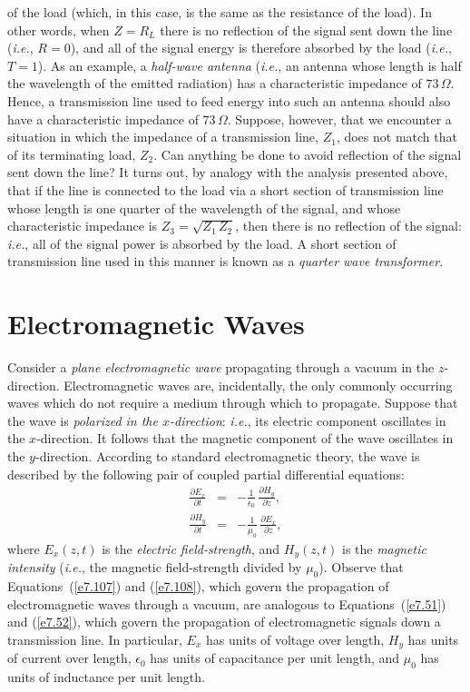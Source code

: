 of the load (which, in this case, is the same as the resistance of the load). In other words,
when $Z=R_L$ there is no reflection of the signal sent down the line ({\em i.e.}, $R=0$),
and all of the signal energy is therefore absorbed by the load ({\em i.e.}, $T=1$). As an example, a
{\em half-wave antenna}\/ ({\em i.e.}, an antenna whose length is half the wavelength
of the emitted radiation) has a characteristic impedance of $73\,\Omega$. Hence, a
transmission line used to feed energy into such an antenna should also have
a characteristic impedance of $73\,\Omega$. Suppose, however, that we encounter a situation in which the
impedance of a transmission line, $Z_1$, does not match that of its
terminating load, $Z_2$. Can anything be done to avoid  reflection of the signal sent down the line? It turns out,
by analogy with the analysis presented above, that if the line is connected
to the load via a short section of transmission line whose length is one quarter
of the wavelength of the signal, and whose characteristic impedance is
$Z_3=\sqrt{Z_1\,Z_2}$, then there is no reflection of the signal: {\em i.e.}, all of the signal power is absorbed by the
load. A short section of transmission line used in this manner is known as a
{\em quarter wave transformer}. 

\section{Electromagnetic Waves}\label{s7.7}
Consider a {\em plane electromagnetic wave}\/ propagating through a vacuum in the $z$-direction. Electromagnetic waves are, incidentally, the only
commonly occurring waves which do not require a medium through which to
propagate. 
Suppose that the wave is {\em polarized in the $x$-direction}: {\em i.e.}, its electric
component  oscillates in the $x$-direction. It follows that the magnetic
component of the wave oscillates in the $y$-direction. According to standard electromagnetic theory, the wave is
described by the following pair of coupled partial differential equations:
\begin{eqnarray}\label{e7.107}
\frac{\partial E_x}{\partial t} &=& - \frac{1}{\epsilon_0}\,\frac{\partial H_y}{\partial z},\label{e7.101}\\[0.5ex]
\frac{\partial H_y}{\partial t} &=& -\frac{1}{\mu_0}\,\frac{\partial E_x}{\partial z},\label{e7.108}
\end{eqnarray}
where $E_x(z,t)$ is the {\em electric field-strength}, and $H_y(z,t)$ is the
{\em magnetic intensity}\/ ({\em i.e.}, the magnetic field-strength divided by
$\mu_0$). Observe that Equations~(\ref{e7.107}) and (\ref{e7.108}), which govern
the propagation of electromagnetic waves through a vacuum, are analogous 
to Equations~(\ref{e7.51}) and (\ref{e7.52}), which govern the propagation of
electromagnetic signals down a transmission line. In particular, $E_x$ has units of
voltage over length, $H_y$ has units of current over length, $\epsilon_0$ has
units of capacitance per unit length, and $\mu_0$ has units of
inductance per unit length. 

